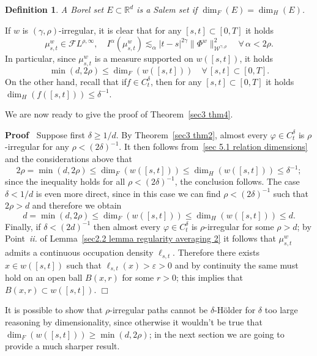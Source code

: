 \documentclass[10pt]{article}
\newcommand{\comma}{{,}}
\newcommand{\tmtextit}[1]{{\itshape{#1}}}
\newenvironment{proof}{\noindent\textbf{Proof\ }}{\hspace*{\fill}$\Box$\medskip}
\newtheorem{definition}[theorem]{Definition}
\begin{document}
\begin{definition}
  A Borel set $E \subset \mathbb{R}^d$ is a Salem set if $\dim_F (E) = \dim_H
  (E)$.
\end{definition}

If $w$ is $(\gamma, \rho)$\mbox{-}irregular, it is clear that for any $[s, t]
\subset [0, T]$ it holds
\[ \mu^w_{s, t} \in \mathcal{F} L^{\rho, \infty}, \quad I^{\alpha} (\mu^w_{s,
   t}) \lesssim_{\alpha} | t - s |^{2 \gamma} \| \Phi^w
   \|^2_{\mathcal{W}^{\gamma \comma \rho}} \quad \forall \, \alpha < 2 \rho .
\]
In particular, since $\mu^w_{s, t}$ is a measure supported on $w ([s, t])$, it
holds
\[ \min (d, 2 \rho) \leqslant \dim_F (w ([s, t])) \quad \forall \, [s, t]
   \subset [0, T] . \]
On the other hand, recall that if$f \in C^{\delta}_t$, then for any $[s, t]
\subset [0, T]$ it holds $\dim_H (f ([s, t])) \leqslant \delta^{- 1}$.

We are now ready to give the proof of Theorem~\ref{sec3 thm4}.

\begin{proof}
  Suppose first $\delta \geqslant 1 / d$. By Theorem~\ref{sec3 thm2}, almost
  every $\varphi \in C^{\delta}_t$ is $\rho$-irregular for any $\rho < (2
  \delta)^{- 1}$. It then follows from~{\eqref{sec 5.1 relation dimensions}}
  and the considerations above that
  \[ 2 \rho = \min (d, 2 \rho) \leqslant \dim_F (w ([s, t])) \leqslant \dim_H
     (w ([s, t])) \leqslant \delta^{- 1} ; \]
  since the inequality holds for all $\rho < (2 \delta)^{- 1}$, the conclusion
  follows. The case $\delta < 1 / d$ is even more direct, since in this case
  we can find $\rho < (2 \delta)^{- 1}$ such that $2 \rho > d$ and therefore
  we obtain
  \[ d = \min (d, 2 \rho) \leqslant \dim_F (w ([s, t])) \leqslant \dim_H (w
     ([s, t])) \leqslant d. \]
  Finally, if $\delta < (2 d)^{- 1}$ then almost every $\varphi \in
  C^{\delta}_t$ is $\rho$\mbox{-}irregular for some $\rho > d$; by
  Point~\tmtextit{ii.} of Lemma~\ref{sec2.2 lemma regularity averaging 2} it
  follows that $\mu^w_{s, t}$ admits a continuous occupation density $\ell_{s,
  t}$. Therefore there exists $x \in w ([s, t])$ such that $\ell_{s, t} (x) >
  \varepsilon > 0$ and by continuity the same must hold on an open ball $B (x,
  r)$ for some $r > 0$; this implies that $B (x, r) \subset w ([s, t])$.
\end{proof}

It is possible to show that $\rho$\mbox{-}irregular paths cannot be
$\delta$\mbox{-}H\"{o}lder for $\delta$ too large reasoning by dimensionality,
since otherwise it wouldn't be true that $\dim_F (w ([s, t])) \geqslant \min
(d, 2 \rho)$; in the next section we are going to provide a much sharper
result.
\end{document}
